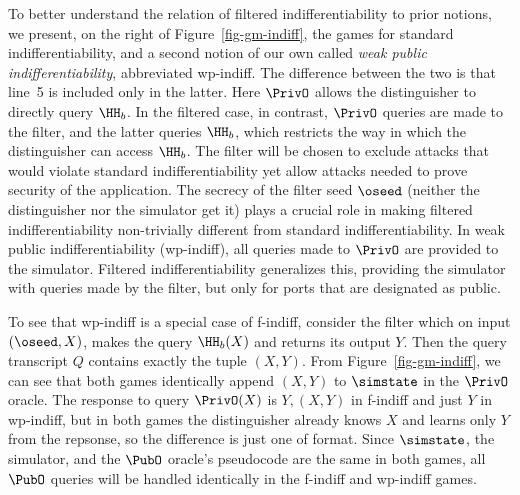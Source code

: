 To better understand the relation of filtered indifferentiability to prior notions, we present, on the right of Figure~\ref{fig-gm-indiff}, the games for standard~\cite{TCC:MauRenHol04} indifferentiability, and a second notion of our own called \textit{weak public indifferentiability}, abbreviated wp-indiff.
The difference between the two is that line~5 is included only in the latter.
Here $\PrivO$ allows the distinguisher to directly query $\HH_b$.
In the filtered case, in contrast, $\PrivO$ queries are made to the filter, and the latter queries $\HH_b$, which restricts the way in which the distinguisher can access $\HH_b$.
The filter will be chosen to exclude attacks that would violate standard indifferentiability yet allow attacks needed to prove security of the application.
The secrecy of the filter seed $\oseed$ (neither the distinguisher nor the simulator get it) plays a crucial role in making filtered indifferentiability non-trivially different from standard indifferentiability.  In weak public indifferentiability (wp-indiff), all queries made to $\PrivO$ are provided to the simulator. Filtered indifferentiability generalizes this, providing the simulator with queries made by the filter, but only for ports that are designated as public.

To see that wp-indiff is a special case of f-indiff, consider the filter which on input $(\oseed, X)$, makes the query $\HH_b(X)$ and returns its output $Y$. Then the query transcript $Q$ contains exactly the tuple $(X,Y)$. From Figure~\ref{fig-gm-indiff}, we can see that both games identically append $(X,Y)$ to $\simstate$ in the $\PrivO$ oracle. The response to query $\PrivO(X)$ is $Y,(X,Y)$ in f-indiff and just $Y$ in wp-indiff, but in both games the distinguisher already knows $X$ and learns only $Y$ from the repsonse, so the difference is just one of format. Since $\simstate$, the simulator, and the $\PubO$ oracle's pseudocode are the same in both games, all $\PubO$ queries will be handled identically in the f-indiff and wp-indiff games.

